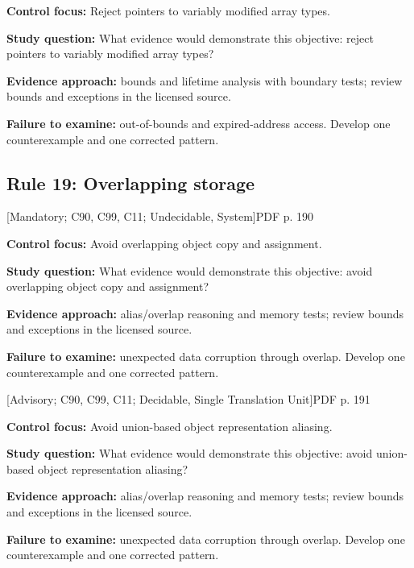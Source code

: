 \documentclass[10pt,letterpaper]{article}
\begin{document}
\textbf{Control focus:} Reject pointers to variably modified array types.\par
\textbf{Study question:} What evidence would demonstrate this objective: reject pointers to variably modified array types?\par
\textbf{Evidence approach:} bounds and lifetime analysis with boundary tests; review bounds and exceptions in the licensed source.\par
\textbf{Failure to examine:} out-of-bounds and expired-address access. Develop one counterexample and one corrected pattern.\par
\smallskip
\subsection{Rule 19: Overlapping storage}
 \textsf{\footnotesize [Mandatory; C90, C99, C11; Undecidable, System]}\hfill{\footnotesize PDF p. 190}\par
\textbf{Control focus:} Avoid overlapping object copy and assignment.\par
\textbf{Study question:} What evidence would demonstrate this objective: avoid overlapping object copy and assignment?\par
\textbf{Evidence approach:} alias/overlap reasoning and memory tests; review bounds and exceptions in the licensed source.\par
\textbf{Failure to examine:} unexpected data corruption through overlap. Develop one counterexample and one corrected pattern.\par
\smallskip
{}
 \textsf{\footnotesize [Advisory; C90, C99, C11; Decidable, Single Translation Unit]}\hfill{\footnotesize PDF p. 191}\par
\textbf{Control focus:} Avoid union-based object representation aliasing.\par
\textbf{Study question:} What evidence would demonstrate this objective: avoid union-based object representation aliasing?\par
\textbf{Evidence approach:} alias/overlap reasoning and memory tests; review bounds and exceptions in the licensed source.\par
\textbf{Failure to examine:} unexpected data corruption through overlap. Develop one counterexample and one corrected pattern.\par
\smallskip
\end{document}
